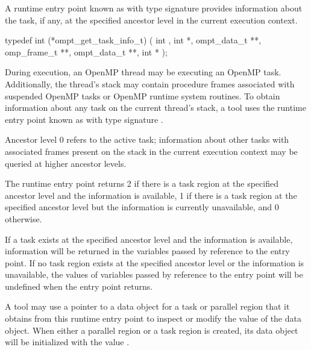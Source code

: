 \label{sec:ompt_get_task_info_t}
\label{sec:ompt_get_task_info}

\summary
A runtime entry point known as 
with type signature  provides information about the
task, if any, at the specified ancestor level in the current execution
context.

\format
\begin{ccppspecific}
\begin{omptInquiry}
typedef int (*ompt_get_task_info_t) (
  int ,
  int *,
  ompt_data_t **,
  omp_frame_t **,
  ompt_data_t **,
  int *
);
\end{omptInquiry}
\end{ccppspecific}

\descr
During execution, an OpenMP thread may be executing an OpenMP task.
Additionally, the thread's stack may contain
procedure frames associated with suspended OpenMP tasks or
OpenMP runtime system routines.
To obtain information about any task on the current thread's stack,
a tool uses the runtime entry point known as
with type signature .

Ancestor level 0 refers to the active task; information about
other tasks with associated frames present on the stack in the current execution context may be queried at
higher ancestor levels.

The  runtime entry point
returns 2 if there is a task region at the
specified ancestor level
and the information is available, 1 if there is a task region at the
specified ancestor level but the information is currently unavailable,
and 0 otherwise.

If a task exists at the specified ancestor level and the information is available,
information will be returned in the variables passed by reference to the entry
point.  If no task region exists at the specified ancestor level
or the information is unavailable,
the values of variables passed by reference to the entry point will be
undefined when the entry point returns.

A tool may use a pointer to a data object for a task or parallel
region that it obtains from this runtime entry point to inspect or modify the
value of the data object.  When either a parallel region or a task
region is created, its data object will be initialized with the value
.

